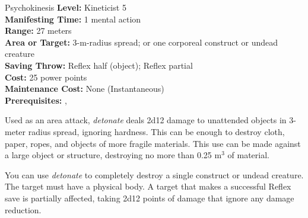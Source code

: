 {Psychokinesis}
{
	\textbf{Level:}
	Kineticist 5\\
	\textbf{Manifesting Time:}
	1 mental action\\
	\textbf{Range:}
	27 meters\\
	\textbf{Area or Target:}
	3-m-radius spread; or one corporeal construct or undead creature\\
	\textbf{Saving Throw:}
	Reflex half (object); Reflex partial\\
	\textbf{Cost:}
	25 power points\\
	\textbf{Maintenance Cost:}
	None (Instantaneous)\\
	\textbf{Prerequisites:}
	, \\
}
{
	Used as an area attack, \emph{detonate} deals 2d12 damage to unattended objects in 3-meter radius spread, ignoring hardness. This can be enough to destroy cloth, paper, ropes, and objects of more fragile materials. This use can be made against a large object or structure, destroying no more than 0.25 m$^3$ of material.

	You can use \emph{detonate} to completely destroy a single construct or undead creature. The target must have a physical body. A target that makes a successful Reflex save is partially affected, taking 2d12 points of damage that ignore any damage reduction.
}
